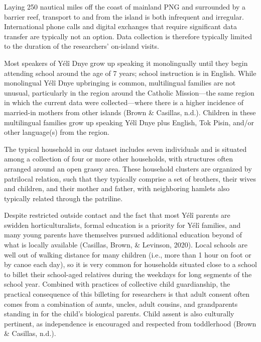 \documentclass[english,,man,floatsintext]{apa6}
\begin{document}
Laying 250 nautical miles off the coast of mainland PNG and surrounded by a barrier reef, transport to and from the island is both infrequent and irregular. International phone calls and digital exchanges that require significant data transfer are typically not an option. Data collection is therefore typically limited to the duration of the researchers' on-island visits.

Most speakers of Yélî Dnye grow up speaking it monolingually until they begin attending school around the age of 7 years; school instruction is in English. While monolingual Yélî Dnye upbringing is common, multilingual families are not unusual, particularly in the region around the Catholic Mission---the same region in which the current data were collected---where there is a higher incidence of married-in mothers from other islands (Brown \& Casillas, n.d.). Children in these multilingual families grow up speaking Yélî Dnye plus English, Tok Pisin, and/or other language(s) from the region.

The typical household in our dataset includes seven individuals and is situated among a collection of four or more other households, with structures often arranged around an open grassy area. These household clusters are organized by patrilocal relation, such that they typically comprise a set of brothers, their wives and children, and their mother and father, with neighboring hamlets also typically related through the patriline.

Despite restricted outside contact and the fact that most Yélî parents are swidden horticulturalists, formal education is a priority for Yélî families, and many young parents have themselves pursued additional education beyond of what is locally available (Casillas, Brown, \& Levinson, 2020). Local schools are well out of walking distance for many children (i.e., more than 1 hour on foot or by canoe each day), so it is very common for households situated close to a school to billet their school-aged relatives during the weekdays for long segments of the school year. Combined with practices of collective child guardianship, the practical consequence of this billeting for researchers is that adult consent often comes from a combination of aunts, uncles, adult cousins, and grandparents standing in for the child's biological parents. Child assent is also culturally pertinent, as independence is encouraged and respected from toddlerhood (Brown \& Casillas, n.d.).
\end{document}
